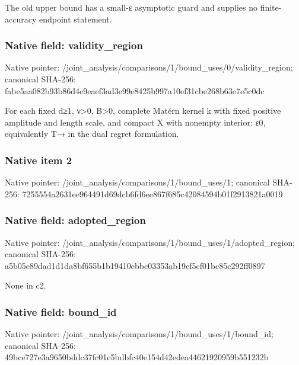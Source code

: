 \documentclass[10pt,a4paper]{article}
\begin{document}
\begingroup\raggedright\sloppy The old upper bound has a small-{\AtlasUnicodeText ε}\allowbreak{} asymptotic guard and supplies no finite-accuracy endpoint statement.\par\endgroup

\subsubsection{Native field: validity\_\allowbreak{}region}
Native pointer: /joint\_\allowbreak{}analysis/comparisons/1/bound\_\allowbreak{}uses/0/validity\_\allowbreak{}region; canonical SHA-256: fabe5aa082b93b86d4e9eaef3ad3e99e8425b997a10ef31cbe268b63e7e5c0dc

\begingroup\raggedright\sloppy For each fixed d{\AtlasUnicodeSymbols ≥}\allowbreak{}1,\allowbreak{} {\AtlasUnicodeText ν}\allowbreak{}>0,\allowbreak{} B>0,\allowbreak{} complete Mat{\AtlasUnicodeText é}\allowbreak{}rn kernel k with fixed positive amplitude and length scale,\allowbreak{} and compact X with nonempty interior:\allowbreak{} {\AtlasUnicodeText ε}\allowbreak{}0,\allowbreak{} equivalently T{\AtlasUnicodeSymbols →}\allowbreak{} in the dual regret formulation.\par\endgroup

\subsubsection{Native item 2}
Native pointer: /joint\_\allowbreak{}analysis/comparisons/1/bound\_\allowbreak{}uses/1; canonical SHA-256: 7255554a2631ee964491d69dcb6fd6ee867f685c42084594b01f2913821a0019

\subsubsection{Native field: adopted\_\allowbreak{}region}
Native pointer: /joint\_\allowbreak{}analysis/comparisons/1/bound\_\allowbreak{}uses/1/adopted\_\allowbreak{}region; canonical SHA-256: a5b05e89dad1d1da8bf655b1b19410ebbc03353ab19cf5cf01bc85c292ff0897

\begingroup\raggedright\sloppy None in c2.\par\endgroup

\subsubsection{Native field: bound\_\allowbreak{}id}
Native pointer: /joint\_\allowbreak{}analysis/comparisons/1/bound\_\allowbreak{}uses/1/bound\_\allowbreak{}id; canonical SHA-256: 49bce727e3a9650bddc37fc01e5bdbfc40e154d42edea44621920959b551232b
\end{document}
